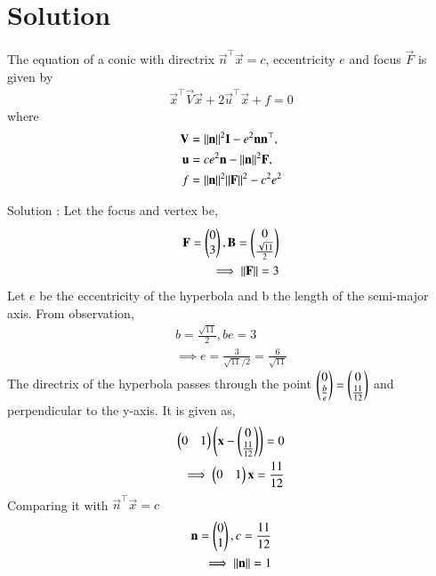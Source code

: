 \documentclass[journal,12pt,twocolumn]{IEEEtran}
\begin{document}
\section{Solution}
\begin{lemma}
The equation of  a conic with directrix $\vec{n}^{\top}\vec{x} = c$, eccentricity $e$ and focus $\vec{F}$ is given by 
\begin{align}
    \label{eq:conic_quad_form}
    \vec{x}^{\top}\vec{V}\vec{x}+2\vec{u}^{\top}\vec{x}+f=0
    \end{align}
where     
\begin{align}
\label{eq:conic_quad_form_v}
\mathbf{V} &=\lVert\mathbf{n}\rVert^2\mathbf{I}-e^2\mathbf{n}\mathbf{n}^{\top}, \\
\label{eq:conic_quad_form_u}
\mathbf{u} &= ce^2\mathbf{n}-\lVert\mathbf{n}\rVert^2\mathbf{F}, \\
\label{eq:conic_quad_form_f}
f &= \lVert\mathbf{n}\rVert^2\lVert\mathbf{F}\rVert^2-c^2e^2
\end{align}
\end{lemma}
Solution : 
Let the focus and vertex be,
\begin{align}
    \mathbf{F} =\begin{pmatrix}0\\ 3\end{pmatrix}, \mathbf{B} =\begin{pmatrix}0\\ \frac{\sqrt{11}}{2}\end{pmatrix}\\
    \implies \lVert\mathbf{F}\rVert = 3
\end{align}
Let $e$ be the eccentricity of the hyperbola and b the length of the semi-major axis. From observation,
\begin{align}
   b = \frac{\sqrt{11}}{2}, be = 3\\
   \implies e = \frac{3}{\sqrt{11}/2} = \frac{6}{\sqrt{11}}
\end{align}
The directrix of the hyperbola passes through the point $\begin{pmatrix}0\\\frac{b}{e}\end{pmatrix} = \begin{pmatrix}0\\\frac{11}{12}\end{pmatrix}$ and perpendicular to the y-axis. It is given as,
\begin{align}
    \begin{pmatrix}0&1\end{pmatrix}\left(\mathbf{x}-\begin{pmatrix}0\\\frac{11}{12}\end{pmatrix}\right) = 0\\
    \implies \begin{pmatrix}0&1\end{pmatrix}\mathbf{x} = \frac{11}{12}
\end{align}
Comparing it with $\vec{n}^{\top}\vec{x} = c$
\begin{align}
    \mathbf{n} = \begin{pmatrix}0\\1\end{pmatrix}, c = \frac{11}{12}\\
    \implies \lVert\mathbf{n}\rVert = 1
\end{align}
\end{document}
